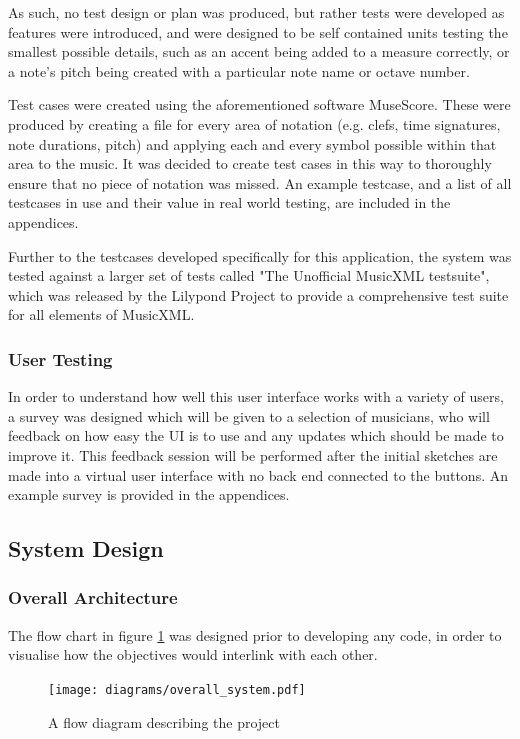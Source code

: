 As such, no test design or plan was produced, but rather tests were developed as features were introduced, and were designed to be self contained units testing the smallest possible details, such as an accent being added to a measure correctly, or a note's pitch being created with a particular note name or octave number.

Test cases were created using the aforementioned software MuseScore. These were produced by creating a file for every area of notation (e.g. clefs, time signatures, note durations, pitch) and applying each and every symbol possible within that area to the music. It was decided to create test cases in this way to thoroughly ensure that no piece of notation was missed. An example testcase, and a list of all testcases in use and their value in real world testing, are included in the appendices.

Further to the testcases developed specifically for this application, the system was tested against a larger set of tests called "The Unofficial MusicXML testsuite", which was released by the Lilypond Project to provide a comprehensive test suite for all elements of MusicXML\parencite{LilypondTestcase}. 

\subsubsection{User Testing}
In order to understand how well this user interface works with a variety of users, a survey was designed which will be given to a selection of musicians, who will feedback on how easy the UI is to use and any updates which should be made to improve it. This feedback session will be performed after the initial sketches are made into a virtual user interface with no back end connected to the buttons. An example survey is provided in the appendices.

\subsection{System Design}
\subsubsection{Overall Architecture}
The flow chart in figure \ref{fig:flowchart} was designed prior to developing any code, in order to visualise how the objectives would interlink with each other.
\begin{figure}[H]
    \centering
    \texttt{[image: diagrams/overall\_system.pdf]}
    \caption{A flow diagram describing the project}
    \label{fig:flowchart}
\end{figure}

